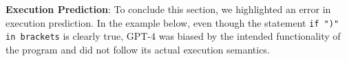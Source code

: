








\textbf{Execution Prediction}: To conclude this section, we highlighted an error in execution prediction. In the example below, even though the statement \texttt{if ")" in brackets} is clearly true, GPT-4 was biased by the intended functionality of the program and did not follow its actual execution semantics.

